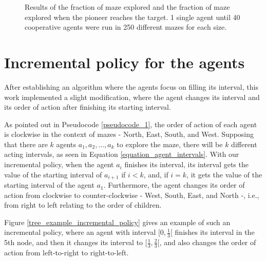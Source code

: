 \begin{figure}
    \centering
    \qquad
    \qquad
    \newline
    \qquad
    \caption{Results of the fraction of maze explored and the fraction of maze explored when the pioneer reaches the target. 1 single agent until 40 cooperative agents were run in 250 different mazes for each size.}
    \label{our_algorithm_fraction}
\end{figure}


\section{Incremental policy for the agents}
\label{section_results_incremental_policy}

After establishing an algorithm where the agents focus on filling its interval, this work implemented a slight modification, where the agent changes its interval and its order of action after finishing its starting interval.

As pointed out in Pseudocode \ref{pseudocode_1}, the order of action of each agent is clockwise in the context of mazes - North, East, South, and West. Supposing that there are $k$ agents $a_{1}, a_{2},...,a_{k}$ to explore the maze, there will be $k$ different acting intervals, as seen in Equation \ref{equation_agent_intervals}. With our incremental policy, when the agent $a_{i}$ finishes its interval, its interval gets the value of the starting interval of $a_{i+1}$ if $i < k$, and, if $i = k$, it gets the value of the starting interval of the agent $a_{1}$. Furthermore, the agent changes its order of action from clockwise to counter-clockwise - West, South, East, and North -, i.e., from right to left relating to the order of children.

Figure \ref{tree_example_incremental_policy} gives an example of such an incremental policy, where an agent with interval $[0, \frac{1}{3}[$ finishes its interval in the 5th node, and then it changes its interval to $[\frac{1}{3}, \frac{2}{3}[$, and also changes the order of action from left-to-right to right-to-left.

